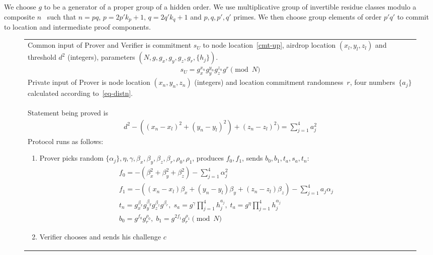 \documentclass{article}
\begin{document}
We choose $g$ to be a generator of a proper group of a hidden order.
We use multiplicative group of invertible residue classes modulo a composite $n$~\cite{Idemix}
such that $n=pq$, $p = 2 p' k_p + 1$, $q = 2 q' k_q + 1$ and $p, q, p', q'$ primes.
We then choose group elements of order $p' q'$ to commit to location and intermediate proof components.


\begin{figure}[!htb]
\begin{tabular}{|p{\linewidth}|}
\hline

Common input of Prover and Verifier is
  commitment $s_U$ to node location~\eqref{cmt-up},
  airdrop location $(x_l, y_l, z_l)$ and
  threshold $d^2$ (integers),
  parameters $(N, g, g_x, g_y, g_z, g_r, \{h_j\})$.
\begin{gather}
\label{cmt-up}
  s_U = g_x^{x_n} g_y^{y_n} g_z^{z_n} g^{r} \pmod{N}
\end{gather}
Private input of Prover is
  node location $(x_n, y_n, z_n)$ (integers) and location commitment randomness~$r$,
  four numbers~$\{a_j\}$ calculated
  according to~\eqref{eq-distn}.
\\
Statement being proved is
\begin{gather}
\label{eq-distn}
  d^2 - ((x_n - x_l)^2 + (y_n - y_l)^2) + (z_n - z_l)^2) = \sum_{j=1}^4 a_j^2
\end{gather}
Protocol runs as follows:
\begin{enumerate}
\item
  Prover picks random $\{\alpha_j\}, \eta, \gamma, \beta_x, \beta_y, \beta_z, \beta_r, \rho_0, \rho_1$,
  produces $f_0, f_1$, sends $b_0, b_1, t_a, s_a, t_n$:
\begin{gather}
  f_0 = -(\beta_x^2 + \beta_y^2 + \beta_z^2) - \sum_{j=1}^4 \alpha_j^2   \\
  f_1 = -( (x_n - x_l) \beta_x  + (y_n - y_l) \beta_y  + (z_n - z_l) \beta_z) - \sum_{j=1}^4 a_j \alpha_j   \\
%
  t_n = g_x^{\beta_x} g_y^{\beta_y} g_z^{\beta_z} g^{\beta_r} ,   \;
  s_a = g^{\gamma} \prod_{j=1}^4 h_j^{a_j},   \;
  t_a = g^{\eta} \prod_{j=1}^4 h_j^{\alpha_j} \\
  b_0 = g^{f_0} g_r^{\rho_0},  \;
  b_1 = g^{2 f_1} g_r^{\rho_1} \pmod{N}
\end{gather}
%
\item
  Verifier chooses and sends his challenge $c$

\end{enumerate}
\end{tabular}
\end{figure}
\end{document}
